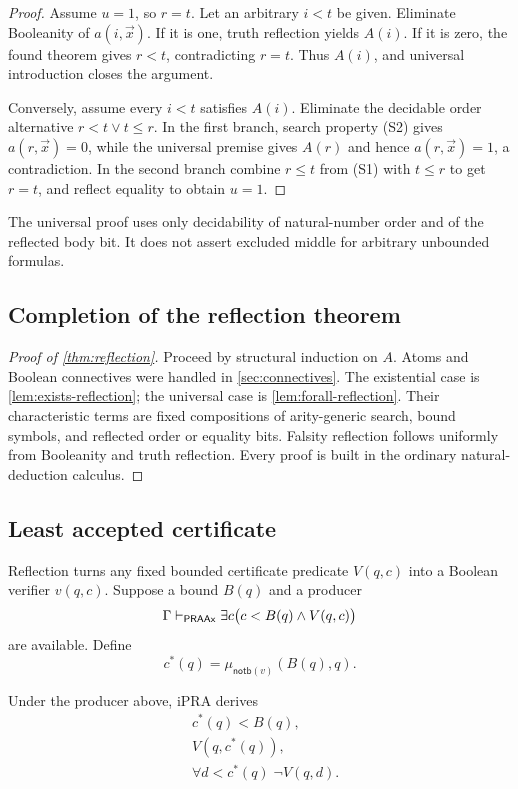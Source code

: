 \begin{proof}
Assume \(u=1\), so \(r=t\).  Let an arbitrary \(i<t\) be given.  Eliminate
Booleanity of \(a(i,\vec x)\).  If it is one, truth reflection yields \(A(i)
\).  If it is zero, the found theorem gives \(r<t\), contradicting \(r=t\).
Thus \(A(i)\), and universal introduction closes the argument.

Conversely, assume every \(i<t\) satisfies \(A(i)\).  Eliminate the decidable
order alternative \(r<t\vee t\le r\).  In the first branch, search property
(S2) gives \(a(r,\vec x)=0\), while the universal premise gives \(A(r)\) and
hence \(a(r,\vec x)=1\), a contradiction.  In the second branch combine
\(r\le t\) from (S1) with \(t\le r\) to get \(r=t\), and reflect equality to
obtain \(u=1\).
\end{proof}

The universal proof uses only decidability of natural-number order and of the
reflected body bit.  It does not assert excluded middle for arbitrary
unbounded formulas.

\subsection{Completion of the reflection theorem}

\begin{proof}[Proof of \cref{thm:reflection}]
Proceed by structural induction on \(A\).  Atoms and Boolean connectives were
handled in \cref{sec:connectives}.  The existential case is
\cref{lem:exists-reflection}; the universal case is
\cref{lem:forall-reflection}.  Their characteristic terms are fixed
compositions of arity-generic search, bound symbols, and reflected order or
equality bits.  Falsity reflection follows uniformly from Booleanity and truth
reflection.  Every proof is built in the ordinary natural-deduction calculus.
\end{proof}

\subsection{Least accepted certificate}

Reflection turns any fixed bounded certificate predicate \(V(q,c)\) into a
Boolean verifier \(v(q,c)\).  Suppose a bound \(B(q)\) and a producer
\[
  \Gamma\mathrel{\vdash_{\mathsf{PRAAx}}}
  \exists c\bigl(c<B(q)\wedge V(q,c)\bigr)
\]
are available.  Define
\[
  c^*(q)=\mu_{\mathsf{notb}(v)}(B(q),q).
\]

\begin{theorem}
\label{thm:least-code}
Under the producer above, iPRA derives
\begin{align*}
  &c^*(q)<B(q),\\
  &V(q,c^*(q)),\\
  &\forall d<c^*(q)\;\neg V(q,d).
\end{align*}
\end{theorem}

